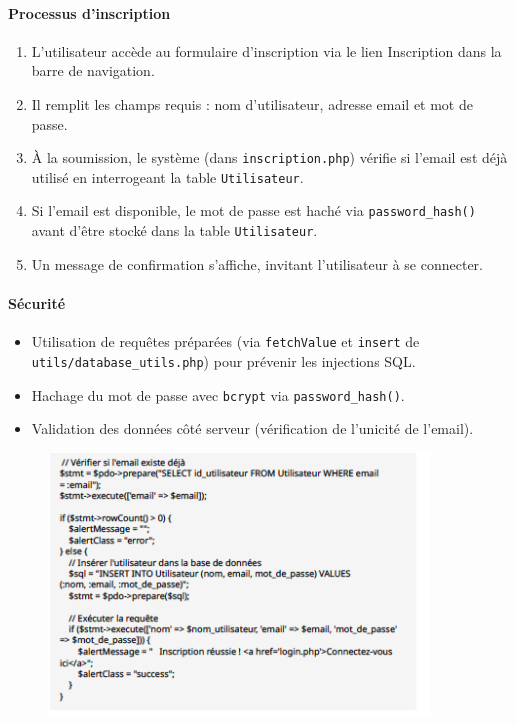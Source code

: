 \documentclass[a4paper,12pt]{article}
\begin{document}
\paragraph{Processus d'inscription}

\begin{enumerate}
  \item L'utilisateur accède au formulaire d'inscription via le lien \og Inscription \fg{} dans la barre de navigation.
  \item Il remplit les champs requis : nom d'utilisateur, adresse email et mot de passe.
  \item À la soumission, le système (dans \texttt{inscription.php}) vérifie si l'email est déjà utilisé en interrogeant la table \texttt{Utilisateur}.
  \item Si l'email est disponible, le mot de passe est haché via \texttt{password\_hash()} avant d’être stocké dans la table \texttt{Utilisateur}.
  \item Un message de confirmation s’affiche, invitant l’utilisateur à se connecter.
\end{enumerate}

\paragraph{Sécurité}

\begin{itemize}
  \item Utilisation de requêtes préparées (via \texttt{fetchValue} et \texttt{insert} de \texttt{utils/database\_utils.php}) pour prévenir les injections SQL.
  \item Hachage du mot de passe avec \texttt{bcrypt} via \texttt{password\_hash()}.
  \item Validation des données côté serveur (vérification de l'unicité de l'email).
\end{itemize}

\begin{figure}[H]
  \centering
  \includegraphics[width=0.9\textwidth]{capture3.png}
\end{figure}
\end{document}
